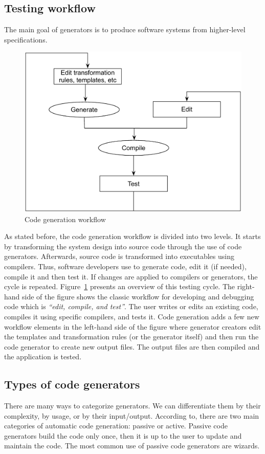 \subsection{Testing workflow}
The main goal of generators is to produce software systems from higher-level specifications.
\begin{figure}[h]
	\center
	\includegraphics[scale=0.6]{Background/fig/workflow}
	\caption{Code generation workflow}
	\label{fig:workflow}
\end{figure}
As stated before, the code generation workflow is divided into two levels. It starts by transforming the system design into source code through the use of code generators. Afterwards, source code is transformed into executables using compilers. Thus, software developers use to generate code, edit it (if needed), compile it and then test it. If changes are applied to compilers or generators, the cycle is repeated. Figure~\ref{fig:workflow} presents an overview of this testing cycle. The right-hand side of the figure shows the classic workflow for developing and debugging code which is \textit{“edit, compile, and test”}. The user writes or edits an existing code, compiles it using specific compilers, and tests it. Code generation adds a few new workflow elements in the left-hand side of the figure where generator creators edit the templates and transformation rules (or the generator itself) and then run the code generator to create new output files. The output files are then compiled and the application is tested. 



\subsection{Types of code generators}
\label{bg:Types of code generators}
There are many ways to categorize generators. We can differentiate them by their complexity, by usage, or by their input/output. According to\cite{herrington2003code}, there are two main categories of automatic code generation: passive or active. Passive code generators build the code only once, then it is up to the user to update and maintain the code. 
The most common use of passive code generators are wizards. 

